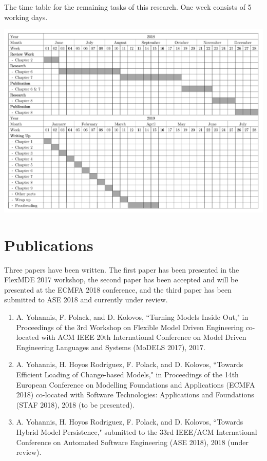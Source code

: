\documentclass[12pt, a4paper]{report} \usepackage[titletoc]{appendix}
\begin{document}
\begin{landscape}

\begin{table}[h]
\centering
\caption{The time table for the remaining tasks of this research. One week consists of 5 working days.}
\label{table:timetable}
\centering
\includegraphics[width=0.86\linewidth]{images/timetable}
\label{fig:timetable}
\end{table}
\end{landscape}



\chapter{Publications}
\label{ch:publications}
Three papers have been written. The first paper \cite{DBLP:conf/models/YohannisKP17} has been presented in the FlexMDE 2017 workshop, the second paper \cite{yohannis2018towards} has been accepted and will be presented at the ECMFA 2018 conference, and the third paper \cite{yohannis2018hybrid} has been submitted to ASE 2018 and currently under review.
\begin{enumerate}
\item A. Yohannis, F. Polack, and D. Kolovos, ``Turning Models Inside Out," in Proceedings of the 3rd Workshop on Flexible Model Driven Engineering co-located with ACM IEEE 20th International Conference on Model Driven Engineering Languages and Systems (MoDELS 2017), 2017.
\item  A. Yohannis, H. Hoyos Rodriguez, F. Polack, and D. Kolovos, ``Towards Efficient Loading of Change-based Models," in Proceedings of the 14th European Conference on Modelling Foundations and Applications (ECMFA 2018) co-located with Software Technologies: Applications and Foundations (STAF 2018), 2018 (to be presented).
\item  A. Yohannis, H. Hoyos Rodriguez, F. Polack, and D. Kolovos, ``Towards Hybrid Model Persistence," submitted to the 33rd IEEE/ACM International Conference on Automated Software Engineering (ASE 2018), 2018 (under review).
\end{enumerate}





\end{document}
